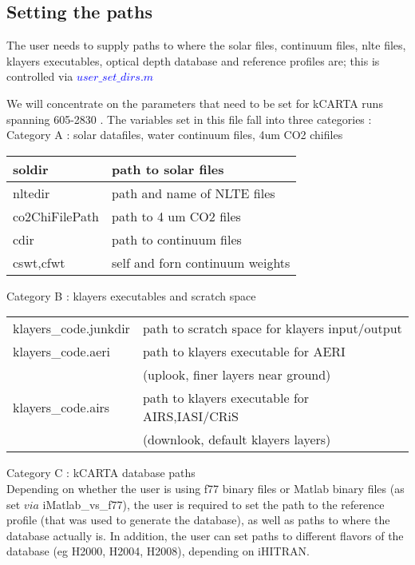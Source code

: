 \documentclass[12pt]{article}
\begin{document}
\subsection{Setting the paths}
The user needs to supply paths to where the solar files, continuum files,
nlte files, klayers executables, optical depth database and reference profiles
are; this is controlled via \textcolor{blue}{$user\_set\_dirs.m$}

We will concentrate on the parameters that need to be set for kCARTA runs
spanning 605-2830 \wn. The variables set in this file fall into three
categories : \\

\vspace{0.2in}
\noindent Category A : solar datafiles, water continuum files, 4um CO2 chifiles\\
\vspace{0.2in}
\begin{tabular}{ll}
\hline
soldir &  path to solar files \\
\hline
nltedir &  path and name of NLTE files\\
co2ChiFilePath & path to 4 um CO2 files\\
\hline
cdir      & path to continuum files \\
cswt,cfwt & self and forn continuum weights \\
\end{tabular}

\vspace{0.2in}
\noindent Category B : klayers executables and scratch space \\
\vspace{0.2in}
\begin{tabular}{ll}
\hline
klayers\_code.junkdir & path to scratch space for klayers input/output\\
klayers\_code.aeri    & path to klayers executable for AERI \\
                     &      (uplook, finer layers near ground)\\
klayers\_code.airs    & path to klayers executable for AIRS,IASI/CRiS\\
                     &     (downlook, default klayers layers)\\
\hline
\end{tabular}

\vspace{0.2in}
\noindent Category C : kCARTA database paths \\
Depending on whether the user is using f77 binary files or Matlab binary files
(as set $via$ iMatlab\_vs\_f77), the user is required to set the path to the reference
profile (that was used to generate the database), as well as paths to where the
database actually is. In addition, the user can set paths to different flavors of
the database (eg H2000, H2004, H2008), depending on iHITRAN.
\end{document}
